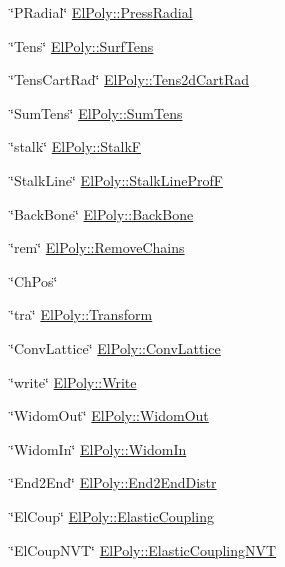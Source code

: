 \begin{DoxyItemize}
\item \char`\"{}\+P\+Radial\char`\"{} \hyperlink{classElPoly_a17a99c936b16e1880291e6c3c5957e44}{El\+Poly\+::\+Press\+Radial} 
\item \char`\"{}\+Tens\char`\"{} \hyperlink{classElPoly_af9a44196e456df096e96d914e19d85c9}{El\+Poly\+::\+Surf\+Tens} 
\item \char`\"{}\+Tens\+Cart\+Rad\char`\"{} \hyperlink{classElPoly_a7282d2e3fe0a3ee0caa631363913cc0a}{El\+Poly\+::\+Tens2d\+Cart\+Rad} 
\item \char`\"{}\+Sum\+Tens\char`\"{} \hyperlink{classElPoly_a35c812e3cfa8e0031dc2b521e075c1c9}{El\+Poly\+::\+Sum\+Tens} 
\item \char`\"{}stalk\char`\"{} \hyperlink{classElPoly_aba321cce3649252deca41a462b0e3d38}{El\+Poly\+::\+StalkF} 
\item \char`\"{}\+Stalk\+Line\char`\"{} \hyperlink{classElPoly_adbfe7fc41363f770eee9c2a9e0e1ed57}{El\+Poly\+::\+Stalk\+Line\+ProfF} 
\item \char`\"{}\+Back\+Bone\char`\"{} \hyperlink{classVarData_abe9b658d50575d5d6be580bc87f3b4ac}{El\+Poly\+::\+Back\+Bone} 
\item \char`\"{}rem\char`\"{} \hyperlink{classElPoly_abfd537703af91a0dceb86c6bba5bd213}{El\+Poly\+::\+Remove\+Chains} 
\item \char`\"{}\+Ch\+Pos\char`\"{} 
\item \char`\"{}tra\char`\"{} \hyperlink{classVarData_aa63b2c1f38f3684a08db6394f92707f1}{El\+Poly\+::\+Transform} 
\item \char`\"{}\+Conv\+Lattice\char`\"{} \hyperlink{classElPoly_a3e03070150b93328661ff2c857eebbf4}{El\+Poly\+::\+Conv\+Lattice} 
\item \char`\"{}write\char`\"{} \hyperlink{classVarData_a054aab836dcf7735720ef32e0b8f7ecb}{El\+Poly\+::\+Write} 
\item \char`\"{}\+Widom\+Out\char`\"{} \hyperlink{classElPoly_aa7a92147aff6a466398908e0f92ca139}{El\+Poly\+::\+Widom\+Out} 
\item \char`\"{}\+Widom\+In\char`\"{} \hyperlink{classElPoly_a3e5c7ada1f6d5a2d37b23a9fb12771f9}{El\+Poly\+::\+Widom\+In} 
\item \char`\"{}\+End2\+End\char`\"{} \hyperlink{classElPoly_a15ee2b235143aabc133fe974aa3258a2}{El\+Poly\+::\+End2\+End\+Distr} 
\item \char`\"{}\+El\+Coup\char`\"{} \hyperlink{classElPoly_a48968ddc44376e55852e9720b3827ebe}{El\+Poly\+::\+Elastic\+Coupling} 
\item \char`\"{}\+El\+Coup\+N\+V\+T\char`\"{} \hyperlink{classElPoly_ab88192e9e4e0f11b68ad828d73ff8957}{El\+Poly\+::\+Elastic\+Coupling\+N\+VT} 

\end{DoxyItemize}
